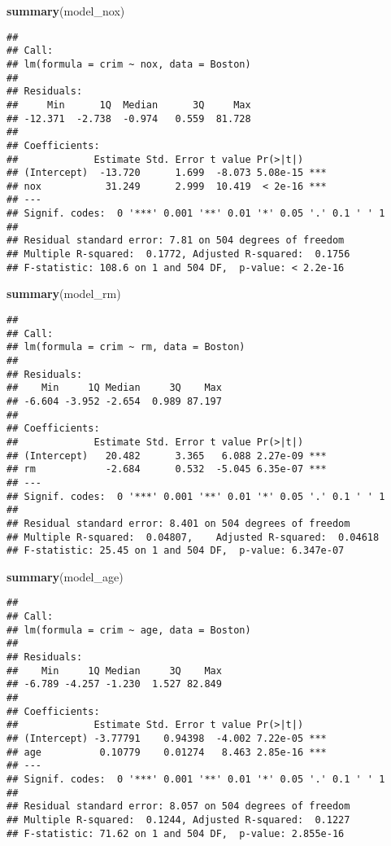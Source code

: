 \documentclass[
]{article}
\newenvironment{Shaded}{\begin{snugshade}}{\end{snugshade}}
\newcommand{\FunctionTok}[1]{\textcolor[rgb]{0.13,0.29,0.53}{\textbf{#1}}}
\newcommand{\NormalTok}[1]{#1}
\begin{document}
\begin{Shaded}
\begin{Highlighting}[]
\FunctionTok{summary}\NormalTok{(model\_nox)}
\end{Highlighting}
\end{Shaded}

\begin{verbatim}
## 
## Call:
## lm(formula = crim ~ nox, data = Boston)
## 
## Residuals:
##     Min      1Q  Median      3Q     Max 
## -12.371  -2.738  -0.974   0.559  81.728 
## 
## Coefficients:
##             Estimate Std. Error t value Pr(>|t|)    
## (Intercept)  -13.720      1.699  -8.073 5.08e-15 ***
## nox           31.249      2.999  10.419  < 2e-16 ***
## ---
## Signif. codes:  0 '***' 0.001 '**' 0.01 '*' 0.05 '.' 0.1 ' ' 1
## 
## Residual standard error: 7.81 on 504 degrees of freedom
## Multiple R-squared:  0.1772, Adjusted R-squared:  0.1756 
## F-statistic: 108.6 on 1 and 504 DF,  p-value: < 2.2e-16
\end{verbatim}

\begin{Shaded}
\begin{Highlighting}[]
\FunctionTok{summary}\NormalTok{(model\_rm)}
\end{Highlighting}
\end{Shaded}

\begin{verbatim}
## 
## Call:
## lm(formula = crim ~ rm, data = Boston)
## 
## Residuals:
##    Min     1Q Median     3Q    Max 
## -6.604 -3.952 -2.654  0.989 87.197 
## 
## Coefficients:
##             Estimate Std. Error t value Pr(>|t|)    
## (Intercept)   20.482      3.365   6.088 2.27e-09 ***
## rm            -2.684      0.532  -5.045 6.35e-07 ***
## ---
## Signif. codes:  0 '***' 0.001 '**' 0.01 '*' 0.05 '.' 0.1 ' ' 1
## 
## Residual standard error: 8.401 on 504 degrees of freedom
## Multiple R-squared:  0.04807,    Adjusted R-squared:  0.04618 
## F-statistic: 25.45 on 1 and 504 DF,  p-value: 6.347e-07
\end{verbatim}

\begin{Shaded}
\begin{Highlighting}[]
\FunctionTok{summary}\NormalTok{(model\_age)}
\end{Highlighting}
\end{Shaded}

\begin{verbatim}
## 
## Call:
## lm(formula = crim ~ age, data = Boston)
## 
## Residuals:
##    Min     1Q Median     3Q    Max 
## -6.789 -4.257 -1.230  1.527 82.849 
## 
## Coefficients:
##             Estimate Std. Error t value Pr(>|t|)    
## (Intercept) -3.77791    0.94398  -4.002 7.22e-05 ***
## age          0.10779    0.01274   8.463 2.85e-16 ***
## ---
## Signif. codes:  0 '***' 0.001 '**' 0.01 '*' 0.05 '.' 0.1 ' ' 1
## 
## Residual standard error: 8.057 on 504 degrees of freedom
## Multiple R-squared:  0.1244, Adjusted R-squared:  0.1227 
## F-statistic: 71.62 on 1 and 504 DF,  p-value: 2.855e-16
\end{verbatim}
\end{document}
